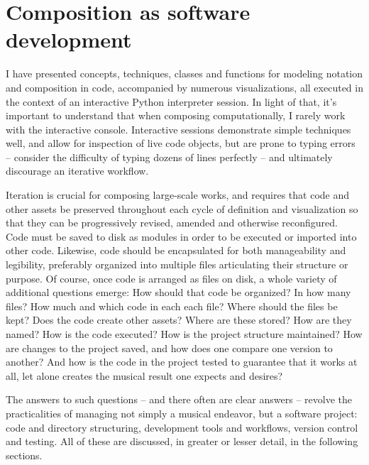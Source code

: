 \chapter{Composition as software development}
\label{chap:practicalities}

 I have presented concepts,
techniques, classes and functions for modeling notation and composition in
code, accompanied by numerous visualizations, all executed in the context of an
interactive Python interpreter session. In light of that, it's important to
understand that when composing computationally, I rarely work with the
interactive console. Interactive sessions demonstrate simple techniques well,
and allow for inspection of live code objects, but are prone to typing errors
-- consider the difficulty of typing dozens of lines perfectly -- and
ultimately discourage an iterative workflow.

Iteration is crucial for composing large-scale works, and requires that code
and other assets be preserved throughout each cycle of definition and
visualization so that they can be progressively revised, amended and otherwise
reconfigured. Code must be saved to disk as modules in order to be executed or
imported into other code. Likewise, code should be encapsulated for both
manageability and legibility, preferably organized into multiple files
articulating their structure or purpose. Of course, once code is arranged as
files on disk, a whole variety of additional questions emerge: How should that
code be organized? In how many files? How much and which code in each each
file? Where should the files be kept? Does the code create other assets? Where
are these stored? How are they named? How is the code executed? How is the
project structure maintained? How are changes to the project saved, and how
does one compare one version to another? And how is the code in the project
tested to guarantee that it works at all, let alone creates the musical result
one expects and desires?

The answers to such questions -- and there often are clear answers -- revolve
the practicalities of managing not simply a musical endeavor, but a software
project: code and directory structuring, development tools and workflows,
version control and testing. All of these are discussed, in greater or lesser
detail, in the following sections.

